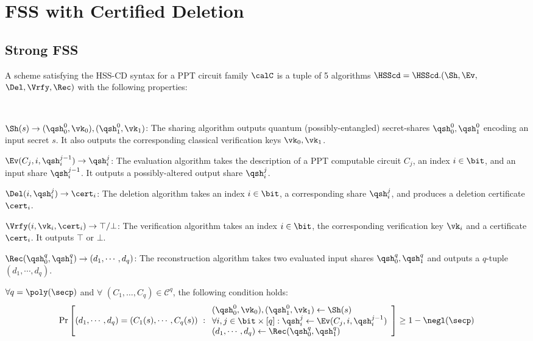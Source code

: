 \section{FSS with Certified Deletion}\label{sec:fss-cd}

\subsection{Strong FSS}
A scheme satisfying the HSS-CD syntax for a PPT circuit family
$\calC$ is a tuple of 5 algorithms $\HSScd = \HSScd.(\Sh, \Ev,$
$\Del, \Vrfy, \Rec)$ with the following properties:

\begin{description}

\item [Syntax:] $ $
\item $\Sh(s) \rightarrow (\qsh_0^0, \vk_0), (\qsh_1^0,
\vk_1)$: The sharing algorithm outputs quantum
(possibly-entangled) secret-shares $\qsh_0^0, \qsh_1^0$ encoding an
input secret $s$. It also outputs the corresponding classical
verification keys $\vk_0, \vk_1$.

\item $\Ev(C_j, i, \qsh_i^{j-1}) \rightarrow \qsh_i^{j}$: The
evaluation algorithm takes the description of a PPT computable
circuit $C_j$, an index $i \in \bit$, and an input share
$\qsh_i^{j-1}$. It outputs a possibly-altered output share
$\qsh_i^{j}$.

\item $\Del(i, \qsh_i^j) \rightarrow \cert_i$: The deletion
algorithm takes an index $i \in \bit$, a corresponding share
$\qsh_i^j$, and produces a deletion certificate $\cert_i$.

\item $\Vrfy(i, \vk_i, \cert_i) \rightarrow \top/\bot$: The
verification algorithm takes an index $i \in \bit$, the
corresponding verification key $\vk_i$ and a certificate $\cert_i$.
It outputs $\top$ or $\bot$.

\item $\Rec(\qsh_0^q, \qsh_1^q) \rightarrow (d_1, \cdots, d_q)$: The
reconstruction algorithm takes two evaluated input shares $\qsh_0^q,
\qsh_1^q$ and outputs a $q$-tuple $(d_1, \cdots, d_q)$.

\item [Evaluation Correctness:] $\forall q = \poly(\secp)$
and $\forall$ $(C_1, \ldots, C_q) \in \mathcal{C}^{q}$, the
following condition holds:
\begin{align}
\Pr\left[
(d_1, \cdots, d_q) = (C_1(s), \cdots, C_q(s))
\ :
\begin{array}{ll}
(\qsh_0^0, \vk_0), (\qsh_1^0, \vk_1) \gets \Sh(s)\\
\forall i,j \in \bit \times [q]: \qsh_i^j \leftarrow \Ev(C_j, i,
\qsh_i^{j-1})\\
(d_1, \cdots, d_q) \leftarrow \Rec(\qsh_0^q, \qsh_1^q)
\end{array}
\right] \geq 1 - \negl(\secp)
\end{align}


\end{description}
